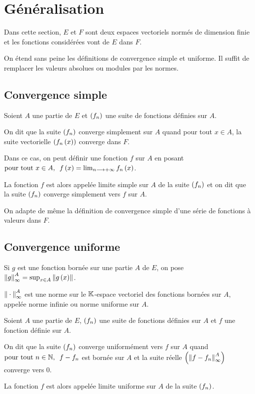 \section{Généralisation}

Dans cette section, \(E\) et \(F\) sont deux espaces vectoriels normés de dimension finie et les fonctions considérées vont de \(E\) dans \(F\).

On étend sans peine les définitions de convergence simple et uniforme. Il suffit de remplacer les valeurs absolues ou modules par les normes.

\subsection{Convergence simple}

\begin{defi}
Soient \(A\) une partie de \(E\) et \(\left(f_n\right)\) une suite de fonctions définies sur \(A\).

On dit que la suite \(\left(f_n\right)\) converge simplement sur \(A\) quand pour tout \(x\in A\), la suite vectorielle \(\left(f_n\left(x\right)\right)\) converge dans \(F\).

Dans ce cas, on peut définir une fonction \(f\) sur \(A\) en posant \(\quantifs{\tpt x\in A}f\paren{x}=\lim_{n\to\pinf}f_n\paren{x}\).

La fonction \(f\) est alors appelée limite simple sur \(A\) de la suite \(\left(f_n\right)\) et on dit que la suite \(\left(f_n\right)\) converge simplement vers \(f\) sur \(A\).
\end{defi}

On adapte de même la définition de convergence simple d'une série de fonctions à valeurs dans \(F\).

\subsection{Convergence uniforme}

\begin{rappel}
Si \(g\) est une fonction bornée sur une partie \(A\) de \(E\), on pose \(\norme{g}_\infty^A=\sup_{x\in A}\norme{g\paren{x}}\).

\(\norme{}_\infty^A\) est une norme sur le \(\mathbb{K}\)-espace vectoriel des fonctions bornées sur \(A\), appelée norme infinie ou norme uniforme sur \(A\).
\end{rappel}

\begin{defi}
Soient \(A\) une partie de \(E\), \(\left(f_n\right)\) une suite de fonctions définies sur \(A\) et \(f\) une fonction définie sur \(A\).

On dit que la suite \(\left(f_n\right)\) converge uniformément vers \(f\) sur \(A\) quand \(\quantifs{\tpt n\in\N}f-f_n\) est bornée sur \(A\) et la suite réelle \(\paren{\norme{f-f_n}_\infty^A}\) converge vers \(0\).

La fonction \(f\) est alors appelée limite uniforme sur \(A\) de la suite \(\left(f_n\right)\).
\end{defi}

